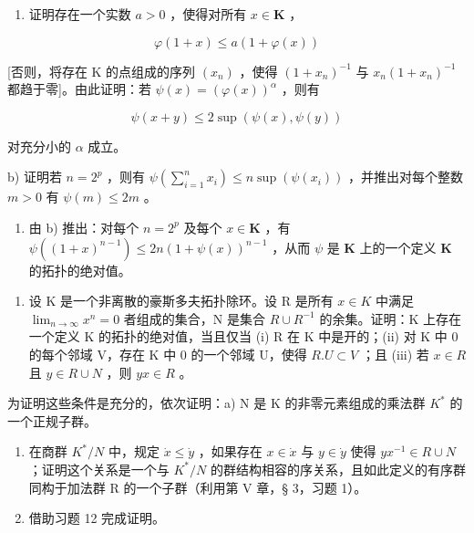 \begin{enumerate}
\def\labelenumi{\alph{enumi})}
\tightlist
\item
  证明存在一个实数 \(a > 0\) ，使得对所有 \(x \in \mathbf{K}\) ，
\end{enumerate}

\[
\varphi (1 + x) \leqslant a (1 + \varphi (x))
\]

{[}否则，将存在 K 的点组成的序列 \((x_{n})\) ，使得 \((1 + x_n)^{-1}\) 与 \(x_{n}(1 + x_{n})^{-1}\) 都趋于零{]}。由此证明：若 \(\psi (x) = (\varphi (x))^{\alpha}\) ，则有

\[
\psi (x + y) \leqslant 2 \sup (\psi (x), \psi (y))
\]

对充分小的 \(\alpha\) 成立。

b) 证明若 \(n = 2^p\) ，则有 \(\psi\left(\sum_{i=1}^{n} x_i\right) \leqslant n \sup (\psi(x_i))\) ，并推出对每个整数 \(m > 0\) 有 \(\psi(m) \leqslant 2m\) 。

\begin{enumerate}
\def\labelenumi{\alph{enumi})}
\setcounter{enumi}{2}
\tightlist
\item
  由 b) 推出：对每个 \(n = 2^p\) 及每个 \(x \in \mathbf{K}\) ，有 \(\psi((1 + x)^{n-1}) \leqslant 2n(1 + \psi(x))^{n-1}\) ，从而 \(\psi\) 是 \(\mathbf{K}\) 上的一个定义 \(\mathbf{K}\) 的拓扑的绝对值。
\end{enumerate}

\begin{enumerate}
\def\labelenumi{\arabic{enumi})}
\setcounter{enumi}{12}
\tightlist
\item
  设 K 是一个非离散的豪斯多夫拓扑除环。设 R 是所有 \(x \in K\) 中满足 \(\lim_{n \to \infty} x^n = 0\) 者组成的集合，N 是集合 \(R \cup R^{-1}\) 的余集。证明：K 上存在一个定义 K 的拓扑的绝对值，当且仅当 (i) R 在 K 中是开的；(ii) 对 K 中 0 的每个邻域 V，存在 K 中 0 的一个邻域 U，使得 \(R.U \subset V\) ；且 (iii) 若 \(x \in R\) 且 \(y \in R \cup N\) ，则 \(yx \in R\) 。
\end{enumerate}

为证明这些条件是充分的，依次证明：a) N 是 K 的非零元素组成的乘法群 \(K^{*}\) 的一个正规子群。

\begin{enumerate}
\def\labelenumi{\alph{enumi})}
\setcounter{enumi}{1}
\item
  在商群 \(K^{*}/N\) 中，规定 \(\dot{x} \leqslant \dot{y}\) ，如果存在 \(x \in \dot{x}\) 与 \(y \in \dot{y}\) 使得 \(yx^{-1} \in R \cup N\) ；证明这个关系是一个与 \(K^{*}/N\) 的群结构相容的序关系，且如此定义的有序群同构于加法群 R 的一个子群（利用第 V 章，§ 3，习题 1）。
\item
  借助习题 12 完成证明。
\end{enumerate}

